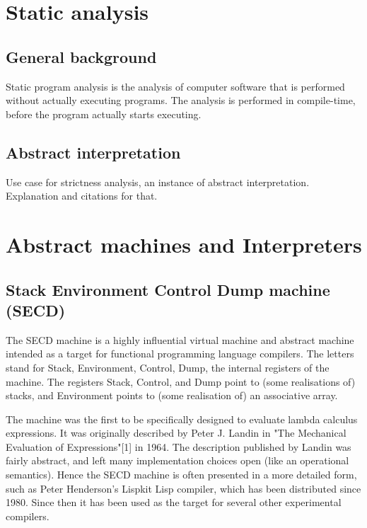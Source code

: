 \documentclass[diploma]{softlab-thesis}
\begin{document}
\section {Static analysis}
\label{sec:static-analysis}

\subsection{General background}

Static program analysis is the analysis of computer software that is performed without actually executing programs.
The analysis is performed in compile-time, before the program actually starts executing. 

\subsection{Abstract interpretation}

Use case for strictness analysis, an instance of 
abstract interpretation. Explanation and citations
for that.

\section{Abstract machines and Interpreters}
\label{sec:abstract-machines}

\subsection {Stack Environment Control Dump machine (SECD)}
\label{sec:secd}

The SECD machine is a highly influential 
virtual machine and abstract 
machine intended as a target for functional programming 
language compilers. The letters stand for Stack, Environment, 
Control, Dump, the internal registers of the machine. 
The registers Stack, Control, and Dump point to (some 
realisations of) stacks, and Environment points to (some 
realisation of) an associative array.

The machine was the first to be specifically designed to 
evaluate lambda calculus expressions. It was originally 
described by Peter J. Landin in "The Mechanical Evaluation 
of Expressions"[1] in 1964. The description published by 
Landin was fairly abstract, and left many implementation 
choices open (like an operational semantics). Hence the SECD 
machine is often presented in a more detailed form, such as 
Peter Henderson's Lispkit Lisp compiler, which has been 
distributed since 1980. Since then it has been used as the 
target for several other experimental compilers.
\end{document}
